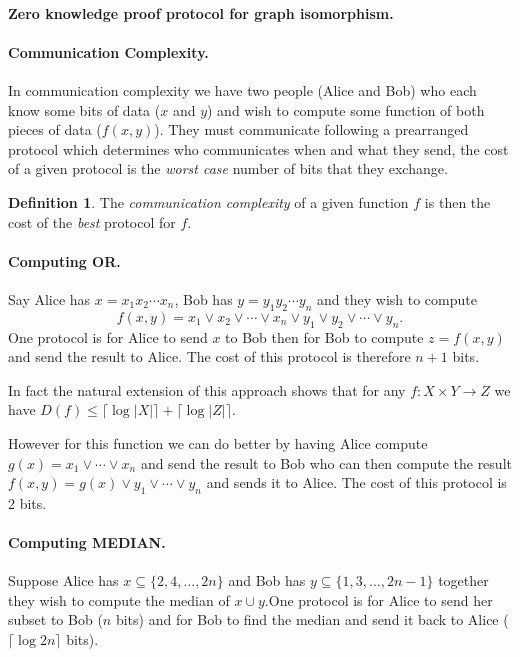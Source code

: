 \documentclass[11pt,a4paper]{article}
\theoremstyle{definition}
\newtheorem{defn}{Definition}
\begin{document}
\paragraph{Zero knowledge proof protocol for graph isomorphism.}

\paragraph{Communication Complexity.}
In communication complexity we have two people (Alice and Bob) who each know some bits of data ($x$ and $y$) and wish to compute some function of both pieces of data ($f(x,y)$).
They must communicate following a prearranged protocol which determines who communicates when and what they send, the cost of a given protocol is the \emph{worst case} number of bits that they exchange.
\begin{defn}
The \emph{communication complexity} of a given function $f$ is then the cost of the \emph{best} protocol for $f$.
\end{defn}

\paragraph{Computing OR.}
Say Alice has $x = x_1x_2\cdots x_n$, Bob has $y = y_1y_2\cdots y_n$ and they wish to compute 
\[
f(x,y) = x_1 \vee x_2 \vee \cdots \vee x_n\vee y_1\vee y_2\vee \cdots \vee y_n.
\]
One protocol is for Alice to send $x$ to Bob then for Bob to compute $z= f(x,y)$ and send the result to Alice.
The cost of this protocol is therefore $n+1$ bits.

In fact the natural extension of this approach shows that for any $f\colon X\times Y \to Z$ we have $D(f) \le \lceil \log|X| \rceil +\lceil \log|Z| \rceil$.

However for this function we can do better by having Alice compute $g(x) = x_1 \vee \cdots \vee x_n$ and send the result to Bob who can then compute the result $f(x,y) = g(x) \vee y_1 \vee \cdots \vee y_n$ and sends it to Alice.
The cost of this protocol is 2 bits.

\paragraph{Computing MEDIAN.}
Suppose Alice has $x \subseteq \{2,4,\ldots,2n\}$ and Bob has $y \subseteq \{1,3,\ldots,2n-1\}$ together they wish to compute the median of $x\cup y$.One protocol is for Alice to send her subset to Bob ($n$ bits) and for Bob to find the median and send it back to Alice ($\lceil \log 2n\rceil$ bits).
\end{document}
